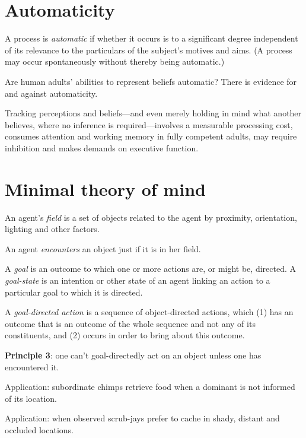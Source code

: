 \documentclass[11pt]{extarticle}
\begin{document}
\begin{multicols}{3}
\section{Automaticity}
A process is \emph{automatic} if whether it occurs is to a significant degree independent of its relevance to the particulars of the subject's motives and aims.
(A process may occur spontaneously without thereby being automatic.)  

Are human adults’ abilities to represent beliefs automatic?
There is evidence for\citep{kovacs_social_2010,Schneider:2011fk} and against\citep{apperly:2008_back,apperly_why_2010} automaticity.

Tracking perceptions and beliefs---and even merely holding in mind what another believes, where no inference is required---involves a measurable processing cost\citep{apperly:2008_back,apperly:2010_limits}, consumes attention and working memory in fully competent adults,\citealp{Apperly:2009cc, lin:2010_reflexively, McKinnon:2007rr} may require inhibition\citep{bull:2008_role} and makes demands on executive function.\citep{apperly:2004_frontal,samson:2005_seeing}


\section{Minimal theory of mind}
An agent’s \emph{field} is a set of objects related to the agent by proximity, orientation, lighting and other factors.

An agent \emph{encounters} an object just if it is in her field.

A \emph{goal} is an outcome to which one or more actions are, or might be, directed.  A \emph{goal-state} is an intention or other state of an agent linking an action to a particular goal to which it is directed.

A \emph{goal-directed action} is a sequence of object-directed actions, which (1) has an outcome that  is an outcome of the whole sequence and not any of its constituents, and (2) occurs in order to bring about this outcome.


\textbf{Principle 3}: one can’t goal-directedly act on an object unless one has encountered it.

Application: subordinate chimps retrieve food when a dominant is not informed of its location.\citep{Hare:2001ph}

Application: when observed scrub-jays prefer to cache in shady, distant and occluded locations.\citep{Dally:2004xf,Clayton:2007fh}


\end{multicols}
\end{document}

